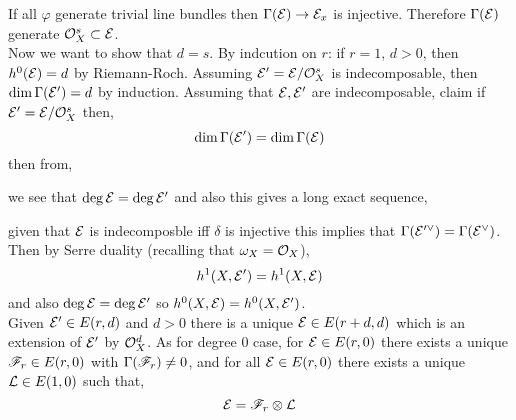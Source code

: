 \documentclass[12pt]{article}
\begin{document}
If all $\varphi$ generate trivial line bundles then $\Gamma(\mathcal{E}) \to \mathcal{E}_x$ is injective. Therefore $\Gamma(\mathcal{E})$ generate $\mathcal{O}_{X}^s \subset \mathcal{E}$.
\bigskip\\
Now we want to show that $d = s$. By indcution on $r$: if $r = 1$, $d > 0$, then $h^0(\mathcal{E}) = d$ by Riemann-Roch. Assuming $\mathcal{E}' = \mathcal{E} / \mathcal{O}_{X}^s$ is indecomposable, then $\dim{\Gamma(\mathcal{E}')} = d$ by induction. Assuming that $\mathcal{E}, \mathcal{E}'$ are indecomposable, claim if $\mathcal{E}' = \mathcal{E} / \mathcal{O}_{X}^s$ then,
\[ \dim{\Gamma(\mathcal{E}')} = \dim{\Gamma(\mathcal{E})} \]
then from,
\begin{center}
\end{center}
we see that $\deg{\mathcal{E}} = \deg{\mathcal{E}'}$ and also this gives a long exact sequence,
\begin{center}
\end{center}
given that $\mathcal{E}$ is indecomposble iff $\delta $ is injective this implies that $\Gamma(\mathcal{E}'^\vee) = \Gamma(\mathcal{E}^\vee)$. Then by Serre duality (recalling that $\omega_X = \mathcal{O}_{X}$),
\[ h^1(X, \mathcal{E}') = h^1(X, \mathcal{E}) \]
and also $\deg{\mathcal{E}} = \deg{\mathcal{E}'}$ so $h^0(X, \mathcal{E}) = h^0(X, \mathcal{E}')$. 
\bigskip\\
Given $\mathcal{E}' \in E(r,d)$ and $d > 0$ there is a unique $\mathcal{E} \in E(r+d, d)$ which is an extension of $\mathcal{E}'$ by $\mathcal{O}_{X}^d$. As for degree $0$ case, for $\mathcal{E} \in E(r,0)$ there exists a unique $\mathscr{F}_r \in E(r, 0)$ with $\Gamma(\mathscr{F}_r) \neq 0$, and for all $\mathcal{E} \in E(r, 0)$ there exists a unique $\mathcal{L} \in E(1, 0)$ such that,
\[ \mathcal{E} = \mathscr{F}_r \otimes \mathcal{L} \]
\end{document}
